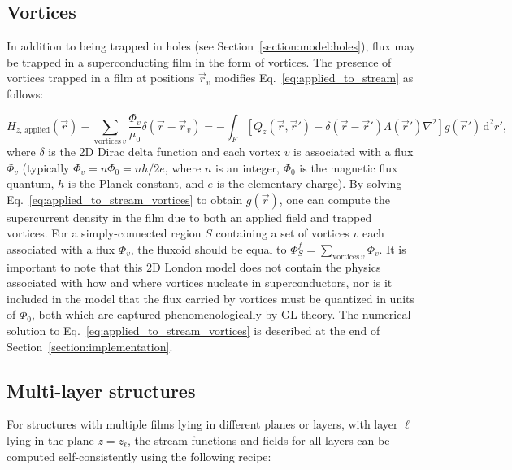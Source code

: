 \documentclass[final,3p,times]{elsarticle}
\newcounter{bla}
\begin{document}
\subsection{Vortices}
\label{section:model:vortices}
In addition to being trapped in holes (see Section~\ref{section:model:holes}), flux may be trapped in a superconducting film in the form of vortices. The presence of vortices trapped in a film at positions $\vec{r}_v$ modifies Eq.~\ref{eq:applied_to_stream} as follows:

\begin{equation}
    \label{eq:applied_to_stream_vortices}
    H_{z,\,\mathrm{applied}}(\vec{r}) - \sum_{\mathrm{vortices}\,v}\frac{\Phi_v}{\mu_0}\delta(\vec{r}-\vec{r}_v)
    = -\int_F\left[
        Q_z(\vec{r},\vec{r}')-\delta(\vec{r}-\vec{r}')\Lambda(\vec{r}')\nabla^2\right
    ]g(\vec{r}')\,\mathrm{d}^2r',
\end{equation}
where $\delta$ is the 2D Dirac delta function and each vortex $v$ is associated with a flux $\Phi_v$ (typically $\Phi_v=n\Phi_0=nh/2e$, where $n$ is an integer, $\Phi_0$ is the magnetic flux quantum, $h$ is the Planck constant, and $e$ is the elementary charge). By solving Eq.~\ref{eq:applied_to_stream_vortices} to obtain $g(\vec{r})$, one can compute the supercurrent density in the film due to both an applied field and trapped vortices. For a simply-connected region $S$ containing a set of vortices $v$ each associated with a flux $\Phi_v$, the fluxoid should be equal to $\Phi^f_S=\sum_{\mathrm{vortices}\,v}\Phi_v$. It is important to note that this 2D London model does not contain the physics associated with how and where vortices nucleate in superconductors, nor is it included in the model that the flux carried by vortices must be quantized in units of $\Phi_0$, both which are captured phenomenologically by GL theory. The numerical solution to Eq.~\ref{eq:applied_to_stream_vortices} is described at the end of Section~\ref{section:implementation}.

\subsection{Multi-layer structures}
\label{section:model:multilayer}

For structures with multiple films lying in different planes or layers, with layer $\ell$ lying in the plane $z=z_\ell$,
the stream functions and fields for all layers can be computed self-consistently using the following recipe:
\end{document}
